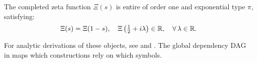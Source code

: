\noindent
The completed zeta function \( \Xi(s) \) is entire of order one and exponential type \( \pi \), satisfying:
\[
\Xi(s) = \Xi(1 - s), \quad \Xi\left( \tfrac{1}{2} + i\lambda \right) \in \mathbb{R}, \quad \forall\, \lambda \in \mathbb{R}.
\]

\medskip

\noindent
For analytic derivations of these objects, see  and . The global dependency DAG in  maps which constructions rely on which symbols.
